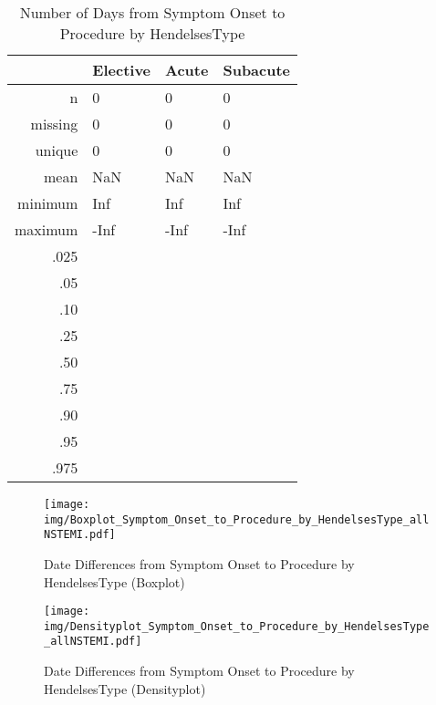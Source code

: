 \documentclass[a4paper]{report}
\begin{document}
\begin{itemize}
{%
\begin{table}[ht]
\centering
\begin{tabular}{rlll}
  \toprule
 & Elective & Acute & Subacute \\ 
  \midrule
n & 0 & 0 & 0 \\ 
  missing & 0 & 0 & 0 \\ 
  unique & 0 & 0 & 0 \\ 
  mean & NaN & NaN & NaN \\ 
  minimum & Inf & Inf & Inf \\ 
  maximum & -Inf & -Inf & -Inf \\ 
  .025 &  &  &  \\ 
  .05 &  &  &  \\ 
  .10 &  &  &  \\ 
  .25 &  &  &  \\ 
  .50 &  &  &  \\ 
  .75 &  &  &  \\ 
  .90 &  &  &  \\ 
  .95 &  &  &  \\ 
  .975 &  &  &  \\ 
   \bottomrule
\end{tabular}
\caption{Number of Days from Symptom Onset to Procedure by HendelsesType} 
\end{table}
\begin{figure}
  \centering
  \caption{Date Differences from Symptom Onset to Procedure by HendelsesType (Boxplot)}
  \label{Boxplot: Date Differences from Symptom Onset to Procedure by HendelsesType}
\texttt{[image: img/Boxplot\_Symptom\_Onset\_to\_Procedure\_by\_HendelsesType\_allNSTEMI.pdf]}\end{figure}


\begin{figure}
  \centering
  \caption{Date Differences from Symptom Onset to Procedure by HendelsesType (Densityplot)}
  \label{Density: Date Differences from Symptom Onset to Procedure by HendelsesType}
\texttt{[image: img/Densityplot\_Symptom\_Onset\_to\_Procedure\_by\_HendelsesType\_allNSTEMI.pdf]}\end{figure}


\clearpage

}
\end{itemize}
\end{document}
